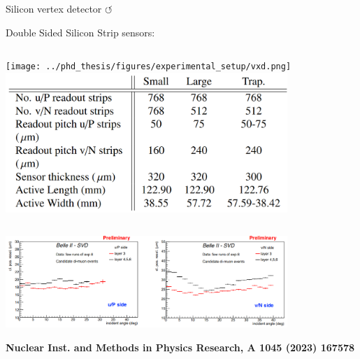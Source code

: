 \documentclass[xcolor=dvipsnames]{beamer}
\begin{document}
\begin{frame}{Silicon vertex detector \hyperlink{frame:A}{$\circlearrowleft$}}
\centering\scriptsize

Double Sided Silicon Strip sensors:
\vspace{10pt}

   \begin{columns}
      \centering
      \texttt{[image: ../phd\_thesis/figures/experimental\_setup/vxd.png]}
      \centering
      \includegraphics[width=0.8\textwidth]{figures/svd_details.png}

   \end{columns}

   \vspace{10pt}

   \includegraphics[width=0.8\textwidth]{figures/svd_resolution.png}

   \begin{flushright}
   \tiny\textbf{Nuclear Inst. and Methods in Physics Research, A 1045 (2023) 167578}
   \end{flushright}
\end{frame}
\end{document}
